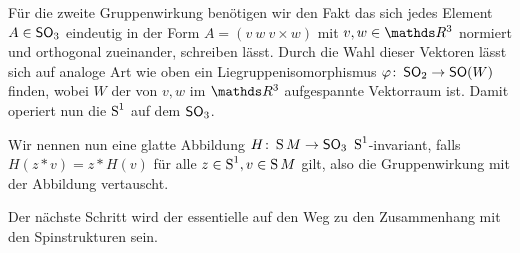 Für die zweite Gruppenwirkung benötigen wir den Fakt das sich jedes
Element $ A \in \so_3$  eindeutig in der Form $ A=\left( v~w~v\times w\right) $ mit $ v,w \in \R^3$ normiert und orthogonal zueinander, 
schreiben lässt. Durch die Wahl dieser Vektoren lässt sich auf
analoge Art wie oben ein Liegruppenisomorphismus $ \abb{\varphi}{\so_2}{\so(W)} $ finden, wobei $ W $ der von $ v,w $ 
im $ \R^3 $ aufgespannte Vektorraum ist. Damit operiert nun die
$ \S^1 $ auf dem $ \so_3 $.

Wir nennen nun eine glatte Abbildung $ \abb{H}{\S M}{\so_3}~\S^1$-invariant, falls $ H(z*v) = z*H(v) $ für alle $ z \in \S^1, v\in \S M $ gilt, also die Gruppenwirkung mit der Abbildung vertauscht. 
 

Der nächste Schritt wird der essentielle auf den Weg zu den
Zusammenhang mit den Spinstrukturen sein.

